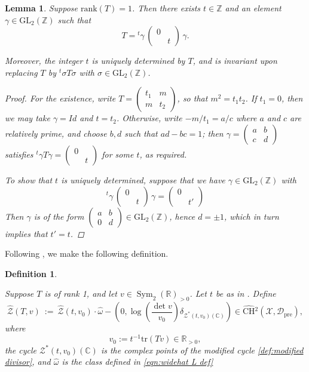 \documentclass[reqno,oneside]{amsart}
\theoremstyle{plain}
\newtheorem{lemma}[theorem]{Lemma}
\newtheorem{definition}[theorem]{Definition}
\theoremstyle{remark}
\numberwithin{theorem}{section}
\newcommand{\bbC}{\mathbb C}
\newcommand{\bbR}{\mathbb R}
\newcommand{\bbZ}{\mathbb Z}
\newcommand{\calD}{\mathcal D}
\newcommand{\calX}{\mathcal X}
\newcommand{\calZ}{\mathcal Z}
\newcommand{\psm}[1]{\left( \begin{smallmatrix}#1 \end{smallmatrix} \right)}
\newcommand{\ChowHat}[1]{\widehat{\mathrm{CH}}{}^{#1}}
\newcommand{\Dpre}{\calD_{\mathrm{pre}}}
\DeclareMathOperator{\Sym}{Sym}
\newcommand{\GL}{\mathrm{GL}}
\begin{document}
	\begin{lemma} \label{lem:rank 1 T}
		Suppose $\mathrm{rank}(T) =1$. Then there exists $t \in \mathbb Z$ and an element $\gamma \in \GL_2(\bbZ)$ such that
		\begin{equation} T =  {}^t\gamma \,  \psm{0 & \\ & t }\, \gamma  			.	
		\end{equation}
		
		Moreover, the integer $t$ is uniquely determined by $T$, and is invariant upon replacing $T$ by ${}^t \sigma T \sigma$ with $\sigma \in \GL_2(\bbZ)$.
		\begin{proof}
			For the existence, write $T = \psm{t_1 & m \\ m & t_2}$, so that $m^2 = t_1 t_2$. If $t_1 = 0$, then we may take $\gamma = Id $ and $ t= t_2$. Otherwise, write $ - m / t_1 = a/c$ where $a $ and $c$ are relatively prime, and choose $b,d$ such that $ad - bc = 1$; then $\gamma = \psm{a & b\\ c & d}$ satisfies ${}^t \gamma T \gamma = \psm{0 & \\ & t}$ for some $t$, as required.
			
			
			To show that $t$ is uniquely determined, suppose that we have $\gamma \in \GL_2(\bbZ)$ with
			\begin{equation}
			{}^t\gamma \,  \psm{0 & \\ & t }\, \gamma =    \psm{0 & \\ & t' }
			\end{equation}
			Then $\gamma $ is of the form $\psm{ a & b \\ 0 & d}\in \GL_2(\bbZ)$, hence $d = \pm 1$, which in turn implies that $t' = t$.
		\end{proof}
	\end{lemma}
	
	Following \cite{KRYbook}, we make the following definition.
	\begin{definition}  \label{def:Z(T) rank 1}
		
		Suppose $T$ is of rank 1, and let $v \in \Sym_2(\bbR)_{>0}$. Let $t$ be as in .
		Define
		\begin{equation}
		\widehat{\calZ}(T,v)  \ := \   \widehat{\calZ}(t,v_0)  \cdot \widehat{\omega}  - \left( 0, \log \left( \frac{\det v}{v_0}\right) \delta_{\calZ^*(t, v_0)(\bbC)} \right)  \in \ChowHat{2}(\calX,\Dpre),
		\end{equation}
		where
		\begin{equation}
		v_0 :=  t^{-1} \mathrm{tr}(Tv) \in \mathbb R_{>0},
		\end{equation}		
		the cycle $\calZ^*(t, v_0)(\bbC)$ is the complex points of the modified cycle \eqref{def:modified divisor},
		and $\widehat \omega$ is the class defined in \eqref{eqn:widehat L def}
	\end{definition}
	
\end{document}
